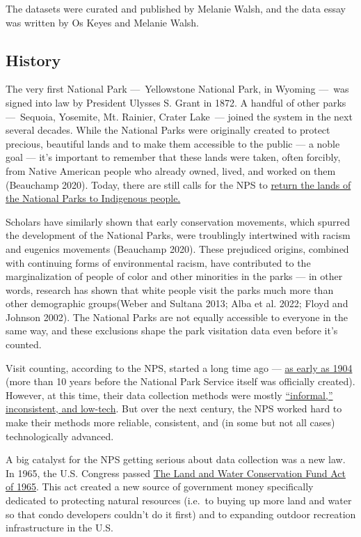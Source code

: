 \documentclass[
  letterpaper,
  DIV=11,
  numbers=noendperiod]{scrartcl}
\begin{document}
The datasets were curated and published by Melanie Walsh, and the data
essay was written by Os Keyes and Melanie Walsh.

\subsection{History}\label{history}

The very first National Park ---~Yellowstone National Park, in Wyoming
---~was signed into law by President Ulysses S. Grant in 1872. A handful
of other parks ---~Sequoia, Yosemite, Mt. Rainier, Crater Lake~---
joined the system in the next several decades. While the National Parks
were originally created to protect precious, beautiful lands and to make
them accessible to the public --- a noble goal --- it's important to
remember that these lands were taken, often forcibly, from Native
American people who already owned, lived, and worked on them (Beauchamp
2020). Today, there are still calls for the NPS to
\href{https://www.theatlantic.com/magazine/archive/2021/05/return-the-national-parks-to-the-tribes/618395/}{return
the lands of the National Parks to Indigenous people.}

Scholars have similarly shown that early conservation movements, which
spurred the development of the National Parks, were troublingly
intertwined with racism and eugenics movements (Beauchamp 2020). These
prejudiced origins, combined with continuing forms of environmental
racism, have contributed to the marginalization of people of color and
other minorities in the parks --- in other words, research has shown
that white people visit the parks much more than other demographic
groups(Weber and Sultana 2013; Alba et al. 2022; Floyd and Johnson
2002). The National Parks are not equally accessible to everyone in the
same way, and these exclusions shape the park visitation data even
before it's counted.

Visit counting, according to the NPS, started a long time ago ---
\href{https://www.nps.gov/subjects/socialscience/visitor-use-statistics.htm}{as
early as 1904} (more than 10 years before the National Park Service
itself was officially created). However, at this time, their data
collection methods were mostly
\href{https://www.nps.gov/subjects/socialscience/visitor-use-statistics.htm}{``informal,''
inconsistent, and low-tech}. But over the next century, the NPS worked
hard to make their methods more reliable, consistent, and (in some but
not all cases) technologically advanced.

A big catalyst for the NPS getting serious about data collection was a
new law. In 1965, the U.S. Congress passed
\href{https://www.everycrsreport.com/reports/RL33531.html}{The Land and
Water Conservation Fund Act of 1965}. This act created a new source of
government money specifically dedicated to protecting natural resources
(i.e.~to buying up more land and water so that condo developers couldn't
do it first) and to expanding outdoor recreation infrastructure in the
U.S.
\end{document}
